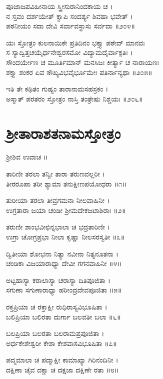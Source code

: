 ಪೂಜಾಜಪವಿಹೀನಾಯ ಸ್ತ್ರೀಸುರಾನಿಂದಕಾಯ ಚ ।\\
ನ ಸ್ತವಂ ದರ್ಶಯೇತ್ ಕ್ವಾಪಿ ಸಂದರ್ಶ್ಯ ಶಿವಹಾ ಭವೇತ್ ।\\
ಪಠನೀಯಂ ಸದಾ ದೇವಿ ಸರ್ವಾವಸ್ಥಾಸು ಸರ್ವದಾ ॥೨೦೪॥

ಯಃ ಸ್ತೋತ್ರಂ ಕುಲನಾಯಿಕೇ ಪ್ರತಿದಿನಂ ಭಕ್ತ್ಯಾ ಪಠೇದ್ ಮಾನವಃ\\
ಸ ಸ್ಯಾದ್ವಿತ್ತಚಯೈರ್ಧನೇಶ್ವರಸಮೋ ವಿದ್ಯಾಮದೈರ್ವಾಕ್ಪತಿಃ ।\\
ಸೌಂದರ್ಯೇಣ ಚ ಮೂರ್ತಿಮಾನ್ ಮನಸಿಜಃ ಕೀರ್ತ್ಯಾ ಚ ನಾರಾಯಣಃ\\
ಶಕ್ತ್ಯಾ ಶಂಕರ ಏವ ಸೌಖ್ಯವಿಭವೈರ್ಭೂಮೇಃ ಪತಿರ್ನಾನ್ಯಥಾ ॥೨೦೫॥

ಇತಿ ತೇ ಕಥಿತಂ ಗುಹ್ಯಂ ತಾರಾನಾಮಸಹಸ್ರಕಂ ।\\
ಅಸ್ಮಾತ್ ಪರತರಂ ಸ್ತೋತ್ರಂ ನಾಸ್ತಿ ತಂತ್ರೇಷು ನಿಶ್ಚಯಃ ॥೨೦೬॥



\section{ಶ್ರೀತಾರಾಶತನಾಮಸ್ತೋತ್ರಂ}


ಶ್ರೀಶಿವ ಉವಾಚ ॥

ತಾರಿಣೀ ತರಲಾ ತನ್ವೀ ತಾರಾ ತರುಣವಲ್ಲರೀ ।\\
ತೀರರೂಪಾ ತರೀ ಶ್ಯಾಮಾ ತನುಕ್ಷೀಣಪಯೋಧರಾ ॥೧॥

ತುರೀಯಾ ತರಲಾ ತೀವ್ರಗಮನಾ ನೀಲವಾಹಿನೀ ।\\
ಉಗ್ರತಾರಾ ಜಯಾ ಚಂಡೀ ಶ್ರೀಮದೇಕಜಟಾಶಿರಾಃ ॥೨॥

ತರುಣೀ ಶಾಂಭವೀಛಿನ್ನಭಾಲಾ ಚ ಭದ್ರತಾರಿಣೀ ।\\
ಉಗ್ರಾ ಚೋಗ್ರಪ್ರಭಾ ನೀಲಾ ಕೃಷ್ಣಾ ನೀಲಸರಸ್ವತೀ ॥೩॥

ದ್ವಿತೀಯಾ ಶೋಭನಾ ನಿತ್ಯಾ ನವೀನಾ ನಿತ್ಯನೂತನಾ ।\\
ಚಂಡಿಕಾ ವಿಜಯಾರಾಧ್ಯಾ ದೇವೀ ಗಗನವಾಹಿನೀ ॥೪॥

ಅಟ್ಟಹಾಸ್ಯಾ ಕರಾಲಾಸ್ಯಾ ಚರಾಸ್ಯಾ ದಿತಿಪೂಜಿತಾ ।\\
ಸಗುಣಾ ಸಗುಣಾರಾಧ್ಯಾ ಹರೀಂದ್ರದೇವಪೂಜಿತಾ ॥೫॥

ರಕ್ತಪ್ರಿಯಾ ಚ ರಕ್ತಾಕ್ಷೀ ರುಧಿರಾಸ್ಯವಿಭೂಷಿತಾ ।\\
ಬಲಿಪ್ರಿಯಾ ಬಲಿರತಾ ದುರ್ಗಾ ಬಲವತೀ ಬಲಾ ॥೬॥

ಬಲಪ್ರಿಯಾ ಬಲರತಾ ಬಲರಾಮಪ್ರಪೂಜಿತಾ ।\\
ಅರ್ಧಕೇಶೇಶ್ವರೀ ಕೇಶಾ ಕೇಶವಾಸವಿಭೂಷಿತಾ ॥೭॥

ಪದ್ಮಮಾಲಾ ಚ ಪದ್ಮಾಕ್ಷೀ ಕಾಮಾಖ್ಯಾ ಗಿರಿನಂದಿನೀ ।\\
ದಕ್ಷಿಣಾ ಚೈವ ದಕ್ಷಾ ಚ ದಕ್ಷಜಾ ದಕ್ಷಿಣೇ ರತಾ ॥೮॥

